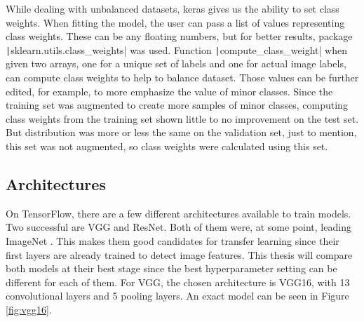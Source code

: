 \documentclass[thesis=B,english]{FITthesis}[2019/12/23]
\begin{document}
While dealing with unbalanced datasets, keras gives us the ability to set class weights. When fitting the model, the user can pass a list of values representing class weights. These can be any floating numbers, but for better results, package \texttt|sklearn.utils.class_weights| was used. Function \texttt|compute_class_weight| when given two arrays, one for a unique set of labels and one for actual image labels, can compute class weights to help to balance dataset. Those values can be further edited, for example, to more emphasize the value of minor classes. Since the training set was augmented to create more samples of minor classes, computing class weights from the training set shown little to no improvement on the test set. But distribution was more or less the same on the validation set, just to mention, this set was not augmented, so class weights were calculated using this set. 

\subsection{Architectures}
On TensorFlow, there are a few different architectures available to train models. Two successful are VGG and ResNet. Both of them were, at some point, leading ImageNet \cite{imagenet_stats}. This makes them good candidates for transfer learning since their first layers are already trained to detect image features. This thesis will compare both models at their best stage since the best hyperparameter setting can be different for each of them. For VGG, the chosen architecture is VGG16, with 13 convolutional layers and 5 pooling layers. An exact model can be seen in Figure \ref{fig:vgg16}.
\end{document}
